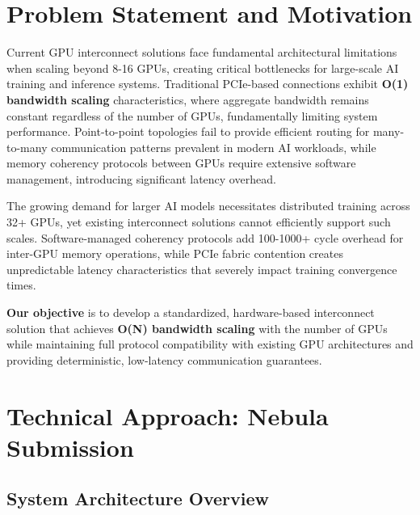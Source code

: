 \documentclass[11pt,a4paper]{article}
\begin{document}
\newpage

\section{Problem Statement and Motivation}

Current GPU interconnect solutions face fundamental architectural limitations when scaling beyond 8-16 GPUs, creating critical bottlenecks for large-scale AI training and inference systems. Traditional PCIe-based connections exhibit \textbf{O(1) bandwidth scaling} characteristics, where aggregate bandwidth remains constant regardless of the number of GPUs, fundamentally limiting system performance. Point-to-point topologies fail to provide efficient routing for many-to-many communication patterns prevalent in modern AI workloads, while memory coherency protocols between GPUs require extensive software management, introducing significant latency overhead.

The growing demand for larger AI models necessitates distributed training across 32+ GPUs, yet existing interconnect solutions cannot efficiently support such scales. Software-managed coherency protocols add 100-1000+ cycle overhead for inter-GPU memory operations, while PCIe fabric contention creates unpredictable latency characteristics that severely impact training convergence times.

\textbf{Our objective} is to develop a standardized, hardware-based interconnect solution that achieves \textbf{O(N) bandwidth scaling} with the number of GPUs while maintaining full protocol compatibility with existing GPU architectures and providing deterministic, low-latency communication guarantees.

\section{Technical Approach: Nebula Submission}

\subsection{System Architecture Overview}
\end{document}
